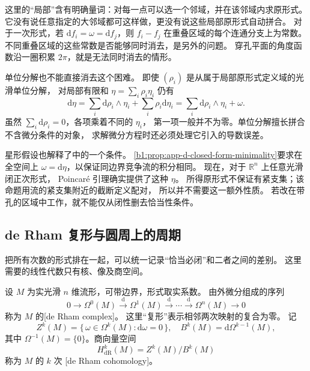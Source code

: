 这里的“局部”含有明确量词：对每一点可以选一个邻域，并在该邻域内求原形式。
它没有说任意指定的大邻域都可这样做，更没有说这些局部原形式自动拼合。
对于一次形式，若 \(\mathrm df_i=\omega=\mathrm df_j\)，则
\(f_i-f_j\) 在重叠区域的每个连通分支上为常数。
不同重叠区域的这些常数是否能够同时消去，是另外的问题。
穿孔平面的角度函数沿一圈积累 \(2\pi\)，就是无法同时消去的情形。

\ProseParagraphBreak

单位分解也不能直接消去这个困难。
即使 \((\rho_i)\) 是从属于局部原形式定义域的光滑单位分解，
对局部有限和 \(\eta=\sum_i\rho_i\eta_i\) 仍有
\[
 \mathrm d\eta
 =\sum_i\mathrm d\rho_i\wedge\eta_i+\sum_i\rho_i\mathrm d\eta_i
 =\sum_i\mathrm d\rho_i\wedge\eta_i+\omega.
\]
虽然 \(\sum_i\mathrm d\rho_i=0\)，各项乘着不同的 \(\eta_i\)，
第一项一般并不为零。单位分解擅长拼合不含微分条件的对象，
求解微分方程时还必须处理它引入的导数误差。

\ProseParagraphBreak

星形假设也解释了中的一个条件。
\cref{b1:prop:app-d-closed-form-minimality}要求在全空间上
\(\omega=\mathrm d\eta\)，以保证同边界竞争流的积分相同。
现在，对于 \(\mathbb R^n\) 上任意光滑闭正次形式，
Poincaré 引理确实提供了这种 \(\eta\)。
所得原形式不保证有紧支集；该命题用流的紧支集附近的截断定义配对，
所以并不需要这一额外性质。
若改在带孔的区域中工作，就不能仅从闭性删去恰当性条件。

\subsection{de Rham 复形与圆周上的周期}
\label{b1:subsec:E10504}

把所有次数的形式排在一起，可以统一记录“恰当必闭”和二者之间的差别。
这里需要的线性代数只有核、像及商空间。

\begin{definition}\label{b1:def:E-de-rham}
设 \(M\) 为实光滑 \(n\) 维流形，可带边界，形式取实系数。
由外微分组成的序列
\[
 0\longrightarrow\Omega^0(M)
 \xrightarrow{\mathrm d}\Omega^1(M)
 \xrightarrow{\mathrm d}\cdots
 \xrightarrow{\mathrm d}\Omega^n(M)
 \longrightarrow0
\]
称为 \(M\) 的[de Rham complex]。
这里“复形”表示相邻两次映射的复合为零。
记
\[
 Z^k(M)=\{\,\omega\in\Omega^k(M):\mathrm d\omega=0\,\},
 \quad B^k(M)=\mathrm d\Omega^{k-1}(M),
\]
其中 \(\Omega^{-1}(M)=\{0\}\)。商向量空间
\begin{equation}\label{b1:eq:E-de-rham-quotient}
 H_{\mathrm{dR}}^k(M)=Z^k(M)/B^k(M)
\end{equation}
称为 \(M\) 的 \(k\) 次
[de Rham cohomology]。
\end{definition}

